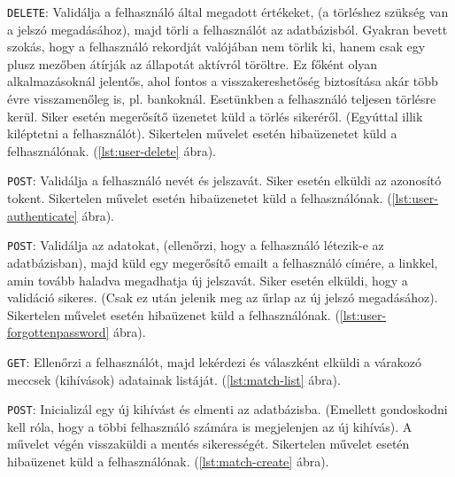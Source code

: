 \texttt{DELETE}: Validálja a felhasználó által megadott értékeket, (a törléshez szükség van a jelszó megadásához), majd törli a felhasználót az adatbázisból. Gyakran bevett szokás, hogy a felhasználó rekordját valójában nem törlik ki, hanem csak egy plusz mezőben átírják az állapotát aktívról töröltre. Ez főként olyan alkalmazásoknál jelentős, ahol fontos a visszakereshetőség biztosítása akár több évre visszamenőleg is, pl. bankoknál. Esetünkben a felhasználó teljesen törlésre kerül.
Siker esetén megerősítő üzenetet küld a törlés sikeréről. (Egyúttal illik kiléptetni a felhasználót).
Sikertelen művelet esetén hibaüzenetet küld a felhasználónak. (\ref{lst:user-delete} ábra).



\texttt{POST}: Validálja a felhasználó nevét és jelszavát.
Siker esetén elküldi az azonosító tokent.
Sikertelen művelet esetén hibaüzenetet küld a felhasználónak. (\ref{lst:user-authenticate} ábra).



\texttt{POST}: Validálja az adatokat, (ellenőrzi, hogy a felhasználó létezik-e az adatbázisban), majd küld egy megerősítő emailt a felhasználó címére, a linkkel, amin tovább haladva megadhatja új jelszavát.
Siker esetén elküldi, hogy a validáció sikeres. (Csak ez után jelenik meg az űrlap az új jelszó megadásához).
Sikertelen művelet esetén hibaüzenet küld a felhasználónak. (\ref{lst:user-forgottenpassword} ábra).




\texttt{GET}: Ellenőrzi a felhasználót, majd lekérdezi és válaszként elküldi a várakozó meccsek (kihívások) adatainak listáját. (\ref{lst:match-list} ábra).



\texttt{POST}: Inicializál egy új kihívást és elmenti az adatbázisba. (Emellett gondoskodni kell róla, hogy a többi felhasználó számára is megjelenjen az új kihívás). A művelet végén visszaküldi a mentés sikerességét.
Sikertelen művelet esetén hibaüzenet küld a felhasználónak. (\ref{lst:match-create} ábra).

